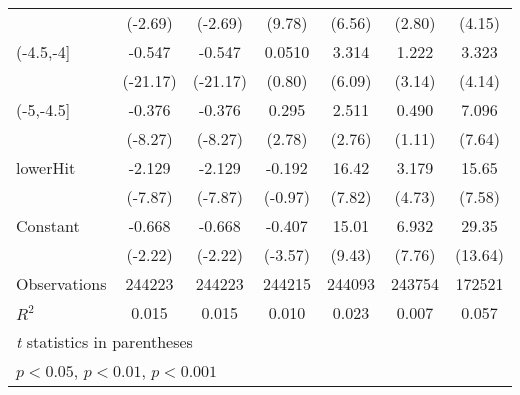{\begin{tabular}{l*{6}{c}}
                    &     (-2.69)         &     (-2.69)         &      (9.78)         &      (6.56)         &      (2.80)         &      (4.15)         \\
[1em]
(-4.5,-4]           &      -0.547\sym{***}&      -0.547\sym{***}&      0.0510         &       3.314\sym{***}&       1.222\sym{**} &       3.323\sym{***}\\
                    &    (-21.17)         &    (-21.17)         &      (0.80)         &      (6.09)         &      (3.14)         &      (4.14)         \\
[1em]
(-5,-4.5]           &      -0.376\sym{***}&      -0.376\sym{***}&       0.295\sym{**} &       2.511\sym{**} &       0.490         &       7.096\sym{***}\\
                    &     (-8.27)         &     (-8.27)         &      (2.78)         &      (2.76)         &      (1.11)         &      (7.64)         \\
[1em]
lowerHit            &      -2.129\sym{***}&      -2.129\sym{***}&      -0.192         &       16.42\sym{***}&       3.179\sym{***}&       15.65\sym{***}\\
                    &     (-7.87)         &     (-7.87)         &     (-0.97)         &      (7.82)         &      (4.73)         &      (7.58)         \\
[1em]
Constant            &      -0.668\sym{*}  &      -0.668\sym{*}  &      -0.407\sym{***}&       15.01\sym{***}&       6.932\sym{***}&       29.35\sym{***}\\
                    &     (-2.22)         &     (-2.22)         &     (-3.57)         &      (9.43)         &      (7.76)         &     (13.64)         \\
\hline
Observations        &      244223         &      244223         &      244215         &      244093         &      243754         &      172521         \\
\(R^{2}\)           &       0.015         &       0.015         &       0.010         &       0.023         &       0.007         &       0.057         \\
\hline\hline
\multicolumn{7}{l}{\footnotesize \textit{t} statistics in parentheses}\\
\multicolumn{7}{l}{\footnotesize \sym{*} \(p<0.05\), \sym{**} \(p<0.01\), \sym{***} \(p<0.001\)}\\
\end{tabular}
}
